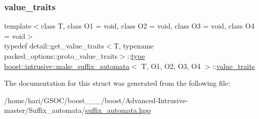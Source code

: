 \subsubsection{\texorpdfstring{value\+\_\+traits}{value\_traits}}
{\footnotesize\ttfamily template$<$class T, class O1 = void, class O2 = void, class O3 = void, class O4 = void$>$ \\
typedef detail\+::get\+\_\+value\+\_\+traits$<$T, typename packed\+\_\+options\+::proto\+\_\+value\+\_\+traits$>$\+::\hyperlink{structboost_1_1intrusive_1_1make__suffix__automata_a9b173abd26090bafc9d89d6ba31b4165}{type} \hyperlink{structboost_1_1intrusive_1_1make__suffix__automata}{boost\+::intrusive\+::make\+\_\+suffix\+\_\+automata}$<$ T, O1, O2, O3, O4 $>$\+::\hyperlink{structboost_1_1intrusive_1_1make__suffix__automata_a167b4c7e5a6fb43ca4238d252d8e823b}{value\+\_\+traits}}



The documentation for this struct was generated from the following file\+:\begin{DoxyCompactItemize}
\item 
/home/hari/\+G\+S\+O\+C/boost\+\_\+\_\+\_/boost/\+Advanced-\/\+Intrusive-\/master/\+Suffix\+\_\+automata/\hyperlink{suffix__automata_8hpp}{suffix\+\_\+automata.\+hpp}\end{DoxyCompactItemize}
